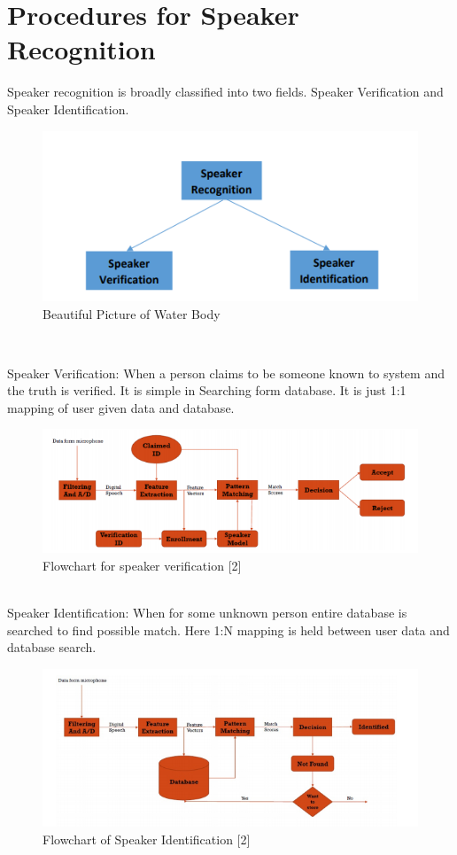 \documentclass[12pt]{scrartcl}
\begin{document}
\section{Procedures for Speaker Recognition}
Speaker recognition is broadly classified into two fields. Speaker Verification and
Speaker Identification.
\begin{figure}[h]
	\centering
	\includegraphics[scale=1]{1.png}
	\caption{Beautiful Picture of Water Body}
\end{figure}\\

\pagebreak

\indent Speaker Verification: When a person claims to be someone known to system
and the truth is verified. It is simple in Searching form database. It is just 1:1 mapping
of user given data and database.
\begin{figure}[h]
	\centering
	\includegraphics[scale=1]{2.png}
	\caption{ Flowchart for speaker verification [2]}
\end{figure}\\
\indent Speaker Identification: When for some unknown person entire database is
searched to find possible match. Here 1:N mapping is held between user data and
database search.
\begin{figure}[h]
	\centering
	\includegraphics[scale=1]{3.png}
	\caption{  Flowchart of Speaker Identification [2]}
\end{figure}\\
\end{document}
